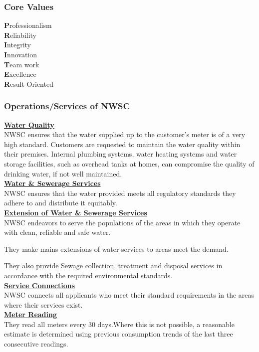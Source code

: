 \documentclass{article}
\begin{document}
\subsubsection{Core Values}
\textbf{P}rofessionalism\\ 
\textbf{R}eliability\\
\textbf{I}ntegrity\\
\textbf{I}nnovation\\
\textbf{T}eam work\\
\textbf{E}xcellence\\
\textbf{R}esult Oriented\\
\subsubsection{Operations/Services of NWSC}
\underline{\textbf{Water Quality}}\\ 
NWSC ensures that the water supplied up to the customer's meter is of a very high standard. Customers are requested to maintain the water quality within their premises. Internal plumbing systems, water heating systems and water storage facilities, such as overhead tanks at homes, can compromise the quality of drinking water, if not well maintained.\\
\underline{\textbf{Water \& Sewerage Services}}\\ 
NWSC ensures that the water  provided meets all regulatory standards they adhere to and distribute it equitably.\\
\underline{\textbf{Extension of Water \& Sewerage Services}}\\ 
NWSC endeavors to serve the populations of the areas in which they operate with clean, reliable and safe water.\par They make mains extensions of water services to areas meet the demand.\par They also provide Sewage collection, treatment and disposal services in accordance with the required environmental standards.\\  
\underline{\textbf{Service Connections}}\\ 
NWSC connects all applicants who meet their standard requirements in the areas where their services exist.\\
\underline{\textbf{Meter Reading}}\\
They read all meters every 30 days.Where this is not possible, a  reasonable estimate is determined using previous consumption trends of the last three consecutive readings.\\
\end{document}

